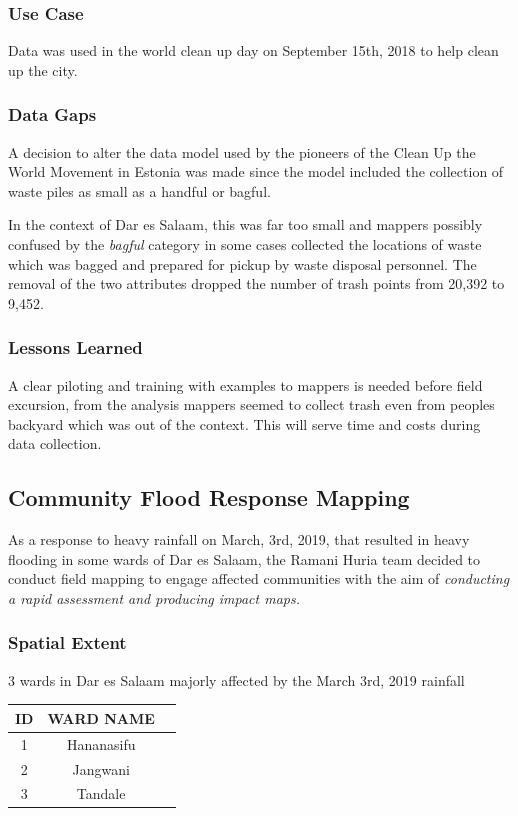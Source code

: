 \documentclass[a4paper,12pt,twoside]{article}
\begin{document}
\subsubsection{Use Case}
Data was used in the world clean up day on  September 15th, 2018 to help clean up the city.

\subsubsection{Data Gaps}
A decision to alter the data model used by the pioneers of the Clean Up the World Movement in Estonia was made since the model included the collection of waste piles as small as a handful or bagful.

In the context of Dar es Salaam, this was far too small and mappers possibly confused by the \textit{bagful} category in some cases collected the locations of waste which was bagged and prepared for pickup by waste disposal personnel. The removal of the two attributes dropped the number of trash points from 20,392 to 9,452.

\subsubsection{Lessons Learned}
A clear piloting and training with examples to mappers is needed before field excursion, from the analysis mappers seemed to collect trash even from peoples backyard which was out of the context. This will serve time and costs during data collection.

\newpage
\subsection{Community Flood Response Mapping}
As a response to heavy rainfall on March, 3rd, 2019, that resulted in heavy flooding in some wards of Dar es Salaam, the Ramani Huria team decided to conduct field mapping to engage affected communities with the aim of \textit{conducting a rapid assessment and producing impact maps.}

\subsubsection{Spatial Extent}
3 wards in Dar es Salaam majorly affected by the March 3rd, 2019 rainfall

\begin{center}
\begin{tabular}{|c|c|c|}
\hline
ID & WARD NAME\\
\hline
1 & Hananasifu\\
\hline
2 & Jangwani\\
\hline
3 & Tandale\\
\hline
\end{tabular}
\end{center}
\end{document}
